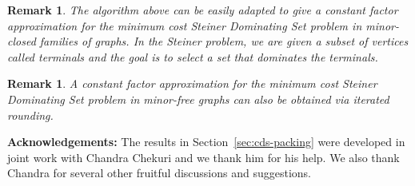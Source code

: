 \documentclass[11pt]{article}
\newtheorem{remark}[lemma]{Remark}
\def\mypar#1{{\medskip\noindent \textbf{#1}}}
\def\prob#1{\textsf{\textup{#1}}\xspace}
\begin{document}
\begin{remark}
	The algorithm above can be easily adapted to give a constant
	factor approximation for the minimum cost \prob{Steiner
	Dominating Set} problem in minor-closed families of graphs. In
	the Steiner problem, we are given a subset of vertices called
	terminals and the goal is to select a set that dominates the
	terminals.
\end{remark}

\begin{remark}
	A constant factor approximation for the minimum cost \prob{Steiner
	Dominating Set} problem in minor-free graphs can also be obtained
	via iterated rounding.
\end{remark}

\mypar{Acknowledgements:}
The results in Section~\ref{sec:cds-packing} were developed in joint
work with Chandra Chekuri and we thank him for his help. We also
thank Chandra for several other fruitful discussions and suggestions.
\newpage


\end{document}
